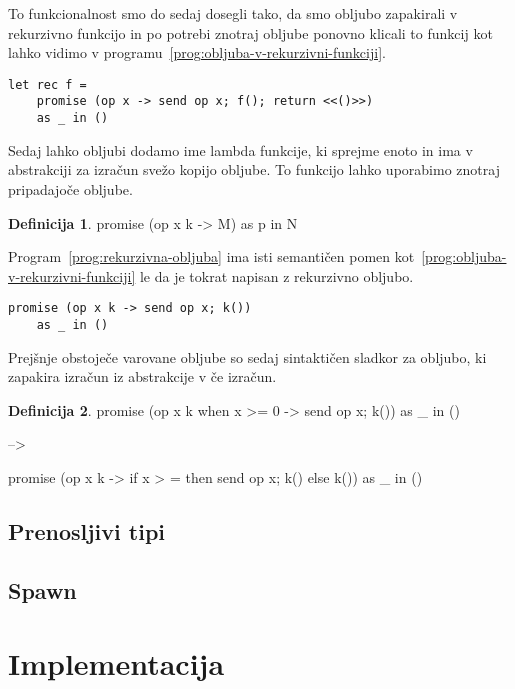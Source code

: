 \documentclass[12pt,a4paper,twoside]{article}
\theoremstyle{definition} %
\newtheorem{definicija}{Definicija}[section]
\theoremstyle{plain} %
\numberwithin{equation}{section}  %
\begin{document}
To funkcionalnost smo do sedaj dosegli tako, da smo obljubo zapakirali v rekurzivno funkcijo in po potrebi znotraj obljube ponovno klicali to funkcij kot lahko vidimo v programu~\ref{prog:obljuba-v-rekurzivni-funkciji}.


\begin{lstlisting}[caption={Obljuba v rekurzivni funkciji.},label={prog:obljuba-v-rekurzivni-funkciji}]
	let rec f =
	promise (op x -> send op x; f(); return <<()>>) 
	as _ in ()
\end{lstlisting}



Sedaj lahko obljubi dodamo ime lambda funkcije, ki sprejme enoto in ima v abstrakciji za izračun svežo kopijo obljube. To funkcijo lahko uporabimo znotraj pripadajoče obljube.

\begin{definicija}
	promise (op x k -> M) as p in N
\end{definicija}

Program~\ref{prog:rekurzivna-obljuba} ima isti semantičen pomen kot~\ref{prog:obljuba-v-rekurzivni-funkciji} le da je tokrat napisan z rekurzivno obljubo.
\begin{lstlisting}[caption={Rekurzivna obljuba.},label={prog:rekurzivna-obljuba}]
	promise (op x k -> send op x; k())
	as _ in ()
\end{lstlisting}

Prejšnje obstoječe varovane obljube so sedaj sintaktičen sladkor za obljubo, ki zapakira izračun iz abstrakcije v če izračun.
\begin{definicija}

	promise (op x k when x >= 0 -> send op x; k())
	as \_ in ()
	
	-->
	
	promise (op x k -> if x > = then send op x; k() else k())
	as \_ in ()
\end{definicija}

\subsection{Prenosljivi tipi}

\subsection{Spawn}


\section{Implementacija}\label{sec:impl}
\end{document}
